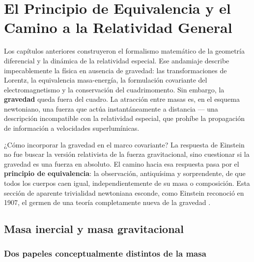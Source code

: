 
\chapter{El Principio de Equivalencia y el Camino a la Relatividad General}
\label{cap:equivalencia}

Los capítulos anteriores construyeron el formalismo matemático de la geometría diferencial y la dinámica de la relatividad especial. Ese andamiaje describe impecablemente la física en ausencia de gravedad: las transformaciones de Lorentz, la equivalencia masa-energía, la formulación covariante del electromagnetismo y la conservación del cuadrimomento. Sin embargo, la \textbf{gravedad} queda fuera del cuadro. La atracción entre masas es, en el esquema newtoniano, una fuerza que actúa instantáneamente a distancia — una descripción incompatible con la relatividad especial, que prohíbe la propagación de información a velocidades superlumínicas.

¿Cómo incorporar la gravedad en el marco covariante? La respuesta de Einstein no fue buscar la versión relativista de la fuerza gravitacional, sino cuestionar si la gravedad es una fuerza en absoluto. El camino hacia esa respuesta pasa por el \textbf{principio de equivalencia}: la observación, antiquísima y sorprendente, de que todos los cuerpos caen igual, independientemente de su masa o composición. Esta sección de aparente trivialidad newtoniana esconde, como Einstein reconoció en 1907, el germen de una teoría completamente nueva de la gravedad \cite{Carroll2004, Misner1973, Schutz2009}.

\section{Masa inercial y masa gravitacional}
\label{sec:masas}

\subsection{Dos papeles conceptualmente distintos de la masa}

